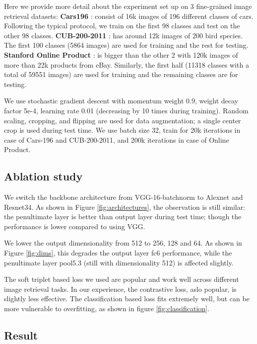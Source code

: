\documentclass[10pt,twocolumn,letterpaper]{article}
\begin{document}
Here we provide more detail about the experiment set up on 3 fine-grained image retrieval datasets:
\textbf{Cars196} \cite{KrauseStarkDengFei-Fei_3DRR2013}: consist of 16k images of 196 different classes of cars. Following the typical protocol, we train on the first 98 classes and test on the other 98 classes.
\textbf{CUB-200-2011} \cite{WahCUB_200_2011}: has around 12k images of 200 bird species. The first 100 classes (5864 images) are used for training and the rest for testing.
\textbf{Stanford Online Product} \cite{song2016deep}: is bigger than the other 2 with 120k images of more than 22k products from eBay. Similarly, the first half (11318 classes with a total of 59551 images) are used for training and the remaining classes are for testing.

We use stochastic gradient descent with momentum weight 0.9, weight decay factor 5e-4, learning rate 0.01 (decreasing by 10 times during training). Random scaling, cropping, and flipping are used for data augmentation; a single center crop is used during test time. We use batch size 32, train for 20k iterations in case of Cars-196 and CUB-200-2011, and 200k iterations in case of Online Product.




\subsection{Ablation study}


We switch the backbone architecture from VGG-16-batchnorm to Alexnet and Resnet34. As shown in Figure \ref{fig:architectures}, the observation is still similar: the penultimate layer is better than output layer during test time; though the performance is lower compared to using VGG.

We lower the output dimensionality from 512 to 256, 128 and 64. As shown in Figure \ref{fig:dims}, this degrades the output layer fc6 performance, while the penultimate layer pool5.3 (still with dimensionality 512) is affected slightly.

The soft triplet based loss we used are popular and work well across different image retrieval tasks. In our experience, the contrastive loss, aslo popular, is slightly less effective. The classification based loss fits extremely well, but can be more vulnerable to overfitting, as shown in figure \ref{fig:classification}.


\subsection{Result}
\end{document}
